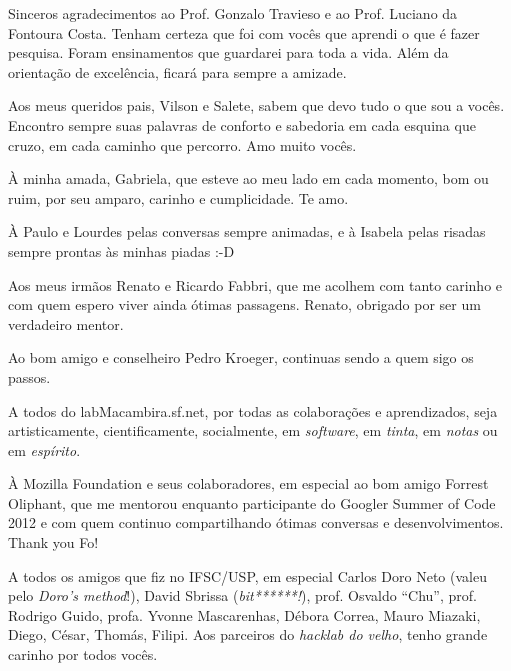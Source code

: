 
Sinceros agradecimentos ao Prof. Gonzalo Travieso e ao Prof. Luciano da Fontoura
Costa. Tenham certeza que foi com vocês que aprendi o que é fazer
pesquisa. Foram ensinamentos que guardarei para toda a vida. Além da orientação
de excelência, ficará para sempre a amizade.

\vspace{4 mm}

Aos meus queridos pais, Vilson e Salete, sabem que devo tudo o que sou a
vocês. Encontro sempre suas palavras de conforto e sabedoria em cada esquina que
cruzo, em cada caminho que percorro. Amo muito vocês.

\vspace{4 mm}

À minha amada, Gabriela, que esteve ao meu lado em cada momento, bom ou ruim,
por seu amparo, carinho e cumplicidade. Te amo.

\vspace{4 mm}

À Paulo e Lourdes pelas conversas sempre animadas, e à Isabela pelas
risadas sempre prontas às minhas piadas :-D

\vspace{4 mm}

Aos meus irmãos Renato e Ricardo Fabbri, que me acolhem com tanto carinho e com
quem espero viver ainda ótimas passagens. Renato, obrigado por ser um verdadeiro
mentor.

\vspace{4 mm}

Ao bom amigo e conselheiro Pedro Kroeger, continuas sendo a quem sigo os passos.

\vspace{4 mm}

A todos do labMacambira.sf.net, por todas as colaborações e aprendizados, seja
artisticamente, cientificamente, socialmente, em \emph{software},
em \emph{tinta}, em \emph{notas} ou em \emph{espírito}.

\vspace{4 mm}

À Mozilla Foundation e seus colaboradores, em especial ao bom amigo Forrest
Oliphant, que me mentorou enquanto participante do Googler Summer of Code 2012 e
com quem continuo compartilhando ótimas conversas e desenvolvimentos. Thank you Fo!

\vspace{4 mm}

A todos os amigos que fiz no IFSC/USP, em especial Carlos Doro Neto (valeu
pelo \textit{Doro's method}!), David Sbrissa (\textit{bit******!}),
prof. Osvaldo ``Chu'', prof. Rodrigo Guido, profa. Yvonne Mascarenhas, Débora
Correa, Mauro Miazaki, Diego, César, Thomás, Filipi. Aos parceiros
do \textit{hacklab do velho}, tenho grande carinho por todos vocês.

